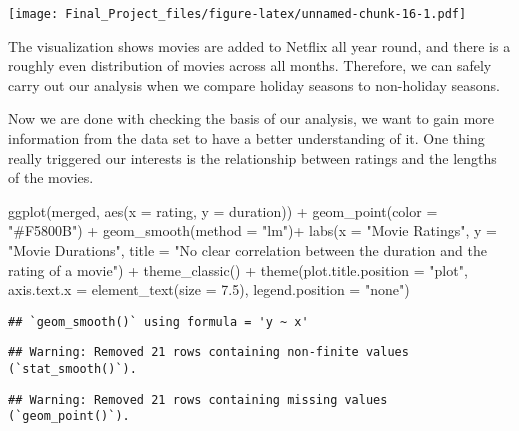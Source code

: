 \documentclass[
]{article}
\newenvironment{Shaded}{\begin{snugshade}}{\end{snugshade}}
\newcommand{\AttributeTok}[1]{\textcolor[rgb]{0.77,0.63,0.00}{#1}}
\newcommand{\FloatTok}[1]{\textcolor[rgb]{0.00,0.00,0.81}{#1}}
\newcommand{\FunctionTok}[1]{\textcolor[rgb]{0.00,0.00,0.00}{#1}}
\newcommand{\NormalTok}[1]{#1}
\newcommand{\SpecialCharTok}[1]{\textcolor[rgb]{0.00,0.00,0.00}{#1}}
\newcommand{\StringTok}[1]{\textcolor[rgb]{0.31,0.60,0.02}{#1}}
\begin{document}
\texttt{[image: Final\_Project\_files/figure-latex/unnamed-chunk-16-1.pdf]}

The visualization shows movies are added to Netflix all year round, and
there is a roughly even distribution of movies across all months.
Therefore, we can safely carry out our analysis when we compare holiday
seasons to non-holiday seasons.

Now we are done with checking the basis of our analysis, we want to gain
more information from the data set to have a better understanding of it.
One thing really triggered our interests is the relationship between
ratings and the lengths of the movies.

\begin{Shaded}
\begin{Highlighting}[]
\FunctionTok{ggplot}\NormalTok{(merged, }\FunctionTok{aes}\NormalTok{(}\AttributeTok{x =}\NormalTok{ rating, }\AttributeTok{y =}\NormalTok{ duration)) }\SpecialCharTok{+}
  \FunctionTok{geom\_point}\NormalTok{(}\AttributeTok{color =} \StringTok{"\#F5800B"}\NormalTok{) }\SpecialCharTok{+}
  \FunctionTok{geom\_smooth}\NormalTok{(}\AttributeTok{method =} \StringTok{"lm"}\NormalTok{)}\SpecialCharTok{+}
  \FunctionTok{labs}\NormalTok{(}\AttributeTok{x =} \StringTok{"Movie Ratings"}\NormalTok{,}
       \AttributeTok{y =} \StringTok{"Movie Durations"}\NormalTok{,}
       \AttributeTok{title =} \StringTok{"No clear correlation between the duration and the rating of a movie"}\NormalTok{) }\SpecialCharTok{+}
  \FunctionTok{theme\_classic}\NormalTok{() }\SpecialCharTok{+}
  \FunctionTok{theme}\NormalTok{(}\AttributeTok{plot.title.position =} \StringTok{"plot"}\NormalTok{,}
        \AttributeTok{axis.text.x =} \FunctionTok{element\_text}\NormalTok{(}\AttributeTok{size =} \FloatTok{7.5}\NormalTok{),}
        \AttributeTok{legend.position =} \StringTok{"none"}\NormalTok{)}
\end{Highlighting}
\end{Shaded}

\begin{verbatim}
## `geom_smooth()` using formula = 'y ~ x'
\end{verbatim}

\begin{verbatim}
## Warning: Removed 21 rows containing non-finite values (`stat_smooth()`).
\end{verbatim}

\begin{verbatim}
## Warning: Removed 21 rows containing missing values (`geom_point()`).
\end{verbatim}
\end{document}
